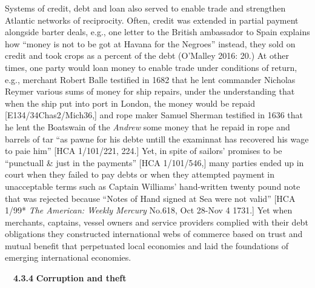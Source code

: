 \begin{styleStandard}
Systems of credit, debt and loan also served to enable trade and strengthen Atlantic networks of reciprocity. Often, credit was extended in partial payment alongside barter deals, e.g., one letter to the British ambassador to Spain explains how “money is not to be got at Havana for the Negroes” instead, they sold on credit and took crops as a percent of the debt (O’Malley 2016: 20.) At other times, one party would loan money to enable trade under conditions of return, e.g., merchant Robert Balle testified in 1682 that he lent commander Nicholas Reymer various sums of money for ship repairs, under the understanding that when the ship put into port in London, the money would be repaid [E134/34Chas2/Mich36,] and rope maker Samuel Sherman testified in 1636 that he lent the Boatswain of the \textit{Andrew} some money that he repaid in rope and barrels of tar “as pawne for his debte untill the examinnat has recovered his wage to paie him” [HCA 1/101/221, 224.] Yet, in spite of sailors’ promises to be “punctuall \& just in the payments” [HCA 1/101/546,] many parties ended up in court when they failed to pay debts or when they attempted payment in unacceptable terms such as Captain Williams’ hand-written twenty pound note that was rejected because “Notes of Hand signed at Sea were not valid” [HCA 1/99* \textit{The American: Weekly Mercury} No.618, Oct 28-Nov 4 1731.] Yet when merchants, captains, vessel owners and service providers complied with their debt obligations they constructed international webs of commerce based on trust and mutual benefit that perpetuated local economies and laid the foundations of emerging international economies. 
\end{styleStandard}


\begin{styleStandard}
\ \ \textbf{4.3.4} \textbf{Corruption and theft}
\end{styleStandard}


